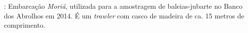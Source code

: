 \label{fig:baleia1}: Embarcação \textit{Moriá}, utilizada para a amostragem de baleias-jubarte no Banco dos Abrolhos em 2014.
É um \textit{trawler} com casco de madeira de ca. 15 metros de comprimento.

